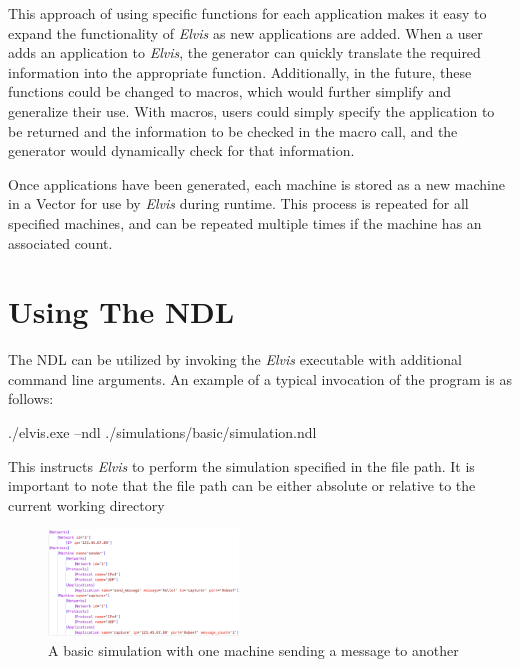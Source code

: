 \documentclass[journal]{IEEEtran} %
\newcommand{\imagewidth}{0.45\textwidth}
\newcommand{\elvis}{\textit{Elvis}}
\begin{document}
This approach of using specific functions for each application makes it easy to expand the functionality of \elvis{} as new applications are added. When a user adds an application to \elvis{}, the generator can quickly translate the required information into the appropriate function. Additionally, in the future, these functions could be changed to macros, which would further simplify and generalize their use. With macros, users could simply specify the application to be returned and the information to be checked in the macro call, and the generator would dynamically check for that information.

Once applications have been generated, each machine is stored as a new machine in a Vector for use by \elvis{} during runtime. This process is repeated for all specified machines, and can be repeated multiple times if the machine has an associated count.

\section{Using The NDL}
The NDL can be utilized by invoking the \elvis{} executable with additional command line arguments. An example of a typical invocation of the program is as follows:

     ./elvis.exe --ndl ./simulations/basic/simulation.ndl
     
This instructs \elvis{} to perform the simulation specified in the file path. It is important to note that the file path can be either absolute or relative to the current working directory

\begin{figure}[H]
    \centerline{\includegraphics[width=\imagewidth]{Images/fig4.png}}
    \caption{A basic simulation with one machine sending a message to another}
    \label{fig:basicsim2}
\end{figure}
\end{document}
